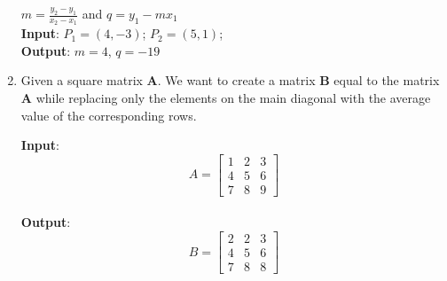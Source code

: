 \documentclass[oneside]{article}
\begin{document}
\begin{enumerate}
\begin{tcolorbox}[blanker, breakable, left=5mm, before skip=10pt, after skip=10pt,
         borderline west={1mm}{0pt}{bluepoli}]
         $m = \frac{y_2 - y_1}{x_2 - x_1}$ and $q = y_1 - mx_1$\\

         \textbf{Input}: $P_{1} = \left(4,-3\right)$; $P_{2} = \left(5,1\right)$;\\
         \textbf{Output}: $m = 4$, $q = -19$\\
      \end{tcolorbox}

   \item Given a square matrix \textbf{A}. We want to create a matrix \textbf{B} equal to
      the matrix \textbf{A} while replacing only the elements on the main diagonal with
      the average value of the corresponding rows.
      \begin{tcolorbox}[blanker, breakable, left=5mm, before skip=10pt, after skip=10pt,
         borderline west={1mm}{0pt}{bluepoli}]
         \textbf{Input}: \begin{equation*}
            A = \begin{bmatrix}
               1 & 2 & 3 \\
               4 & 5 & 6 \\
               7 & 8 & 9
            \end{bmatrix}
            \end{equation*}\\
         \textbf{Output}: \begin{equation*}
            B = \begin{bmatrix}
               2 & 2 & 3 \\
               4 & 5 & 6 \\
               7 & 8 & 8
            \end{bmatrix}
            \end{equation*}
      \end{tcolorbox}


\end{enumerate}
\end{document}
